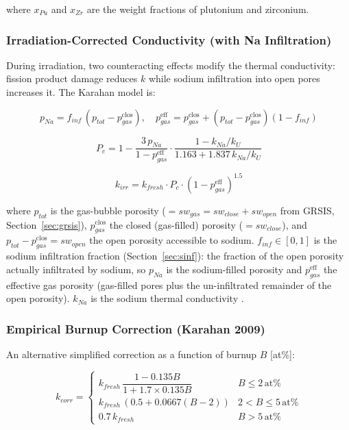 \begin{refsection}
where $x_{Pu}$ and $x_{Zr}$ are the weight fractions of plutonium and zirconium.

\subsubsection{Irradiation-Corrected Conductivity (with Na Infiltration)}

During irradiation, two counteracting effects modify the thermal conductivity: fission product damage reduces $k$ while sodium infiltration into open pores increases it.  The Karahan model \cite{karahan2009} is:

\begin{equation}
  p_{Na} = f_{inf}\,(p_{tot} - p^{\text{clos}}_{gas}), \quad
  p^{\text{eff}}_{gas} = p^{\text{clos}}_{gas} + (p_{tot} - p^{\text{clos}}_{gas})(1 - f_{inf})
  \label{eq:pna}
\end{equation}

\begin{equation}
  P_c = 1 - \frac{3\,p_{Na}}{1 - p^{\text{eff}}_{gas}}\cdot
             \frac{1 - k_{Na}/k_U}{1.163 + 1.837\,k_{Na}/k_U}
  \label{eq:Pc}
\end{equation}

\begin{equation}
  k_{irr} = k_{fresh}\cdot P_c\cdot(1 - p^{\text{eff}}_{gas})^{1.5}
  \label{eq:k_irr}
\end{equation}

where $p_{tot}$ is the gas-bubble porosity ($= sw_{gas} = sw_{close} + sw_{open}$ from GRSIS, Section~\ref{sec:grsis}), $p^{\text{clos}}_{gas}$ the closed (gas-filled) porosity ($= sw_{close}$), and $p_{tot} - p^{\text{clos}}_{gas} = sw_{open}$ the open porosity accessible to sodium.  $f_{inf} \in [0,1]$ is the sodium infiltration fraction (Section~\ref{sec:sinf}): the fraction of the open porosity actually infiltrated by sodium, so $p_{Na}$ is the sodium-filled porosity and $p^{\text{eff}}_{gas}$ the effective gas porosity (gas-filled pores plus the un-infiltrated remainder of the open porosity).  $k_{Na}$ is the sodium thermal conductivity \cite{fink1995}.

\subsubsection{Empirical Burnup Correction (Karahan 2009)}

An alternative simplified correction as a function of burnup $B$ [at\%]:

\begin{equation}
  k_{corr} = \begin{cases}
    k_{fresh}\,\dfrac{1 - 0.135B}{1 + 1.7\times0.135B} & B \leq 2\,\text{at\%} \\[6pt]
    k_{fresh}\,(0.5 + 0.0667(B-2))                     & 2 < B \leq 5\,\text{at\%} \\[6pt]
    0.7\,k_{fresh}                                       & B > 5\,\text{at\%}
  \end{cases}
  \label{eq:k_bup_corr}
\end{equation}


\end{refsection}
